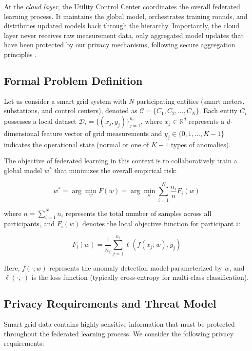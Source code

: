 \documentclass{ieeeaccess}
\theoremstyle{definition}
\begin{document}
At the \textit{cloud layer}, the Utility Control Center coordinates the overall federated learning process. It maintains the global model, orchestrates training rounds, and distributes updated models back through the hierarchy. Importantly, the cloud layer never receives raw measurement data, only aggregated model updates that have been protected by our privacy mechanisms, following secure aggregation principles \cite{abdellatif2024sdcl}.

\subsection{Formal Problem Definition}

Let us consider a smart grid system with $N$ participating entities (smart meters, substations, and control centers), denoted as $\mathcal{C} = \{C_1, C_2, ..., C_N\}$. Each entity $C_i$ possesses a local dataset $\mathcal{D}_i = \{(x_j, y_j)\}_{j=1}^{n_i}$, where $x_j \in \mathbb{R}^d$ represents a $d$-dimensional feature vector of grid measurements and $y_j \in \{0, 1, ..., K-1\}$ indicates the operational state (normal or one of $K-1$ types of anomalies).

The objective of federated learning in this context is to collaboratively train a global model $w^*$ that minimizes the overall empirical risk:

\begin{equation}
w^* = \arg\min_{w} F(w) = \arg\min_{w} \sum_{i=1}^{N} \frac{n_i}{n} F_i(w)
\end{equation}

where $n = \sum_{i=1}^{N} n_i$ represents the total number of samples across all participants, and $F_i(w)$ denotes the local objective function for participant $i$:

\begin{equation}
F_i(w) = \frac{1}{n_i} \sum_{j=1}^{n_i} \ell(f(x_j; w), y_j)
\end{equation}

Here, $f(\cdot; w)$ represents the anomaly detection model parameterized by $w$, and $\ell(\cdot, \cdot)$ is the loss function (typically cross-entropy for multi-class classification).

\subsection{Privacy Requirements and Threat Model}

Smart grid data contains highly sensitive information that must be protected throughout the federated learning process. We consider the following privacy requirements:
\end{document}
